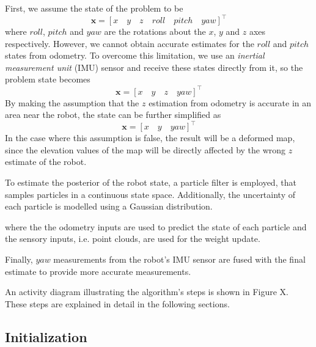 First, we assume the state of the problem to be
\begin{equation}
    \mathbf{x} =
    {[x \quad y \quad z \quad roll \quad pitch \quad yaw]}^\intercal
\end{equation}
where $roll$, $pitch$ and $yaw$ are the rotations about the $x$, $y$ and $z$
axes respectively.
However, we cannot obtain accurate estimates for the $roll$ and $pitch$ states
from odometry.
To overcome this limitation, we use an \textit{inertial measurement unit} (IMU)
sensor and receive these states directly from it, so the problem state becomes
\begin{equation}
    \mathbf{x} = {[x \quad y \quad z \quad yaw]}^\intercal
\end{equation}
By making the assumption that the $z$ estimation from odometry is accurate
in an area near the robot, the state can be further simplified as
\begin{equation}
    \mathbf{x} = {[x \quad y \quad yaw]}^\intercal
\end{equation}
In the case where this assumption is false, the result will be a deformed
map, since the elevation values of the map will be directly affected
by the wrong $z$ estimate of the robot.

To estimate the posterior of the robot state, a particle filter is employed,
that samples particles in a continuous state space.
Additionally, the uncertainty of each particle is modelled using
a Gaussian distribution.

where the
the odometry inputs are used to predict the state of each particle and
the sensory inputs, i.e. point clouds, are used for the weight update.

Finally, $yaw$ measurements from the robot's IMU sensor are fused with the
final estimate to provide more accurate measurements.


An activity diagram illustrating the algorithm's steps is shown in Figure X.
These steps are explained in detail in the following sections.


\subsection{Initialization}

